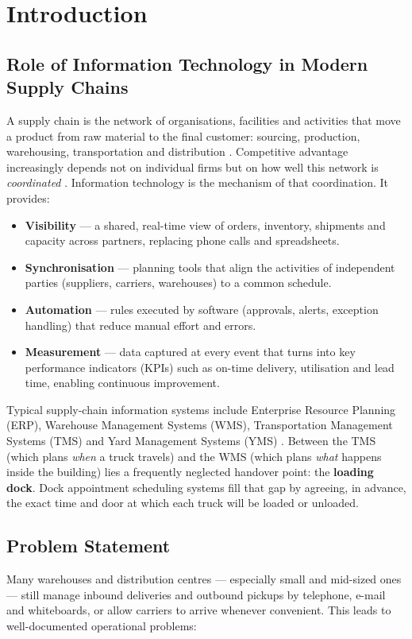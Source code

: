\chapter{Introduction}

\section{Role of Information Technology in Modern Supply Chains}
A supply chain is the network of organisations, facilities and activities that move a product from raw material to the final customer: sourcing, production, warehousing, transportation and distribution \cite{chopra2016}. Competitive advantage increasingly depends not on individual firms but on how well this network is \emph{coordinated} \cite{christopher2016}. Information technology is the mechanism of that coordination. It provides:

\begin{itemize}
  \item \textbf{Visibility} --- a shared, real-time view of orders, inventory, shipments and capacity across partners, replacing phone calls and spreadsheets.
  \item \textbf{Synchronisation} --- planning tools that align the activities of independent parties (suppliers, carriers, warehouses) to a common schedule.
  \item \textbf{Automation} --- rules executed by software (approvals, alerts, exception handling) that reduce manual effort and errors.
  \item \textbf{Measurement} --- data captured at every event that turns into key performance indicators (KPIs) such as on-time delivery, utilisation and lead time, enabling continuous improvement.
\end{itemize}

Typical supply-chain information systems include Enterprise Resource Planning (ERP), Warehouse Management Systems (WMS), Transportation Management Systems (TMS) and Yard Management Systems (YMS) \cite{ivanov2019}. Between the TMS (which plans \emph{when} a truck travels) and the WMS (which plans \emph{what} happens inside the building) lies a frequently neglected handover point: the \textbf{loading dock}. Dock appointment scheduling systems fill that gap by agreeing, in advance, the exact time and door at which each truck will be loaded or unloaded.

\section{Problem Statement}
Many warehouses and distribution centres --- especially small and mid-sized ones --- still manage inbound deliveries and outbound pickups by telephone, e-mail and whiteboards, or allow carriers to arrive whenever convenient. This leads to well-documented operational problems:

